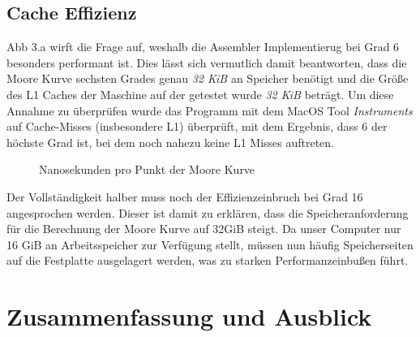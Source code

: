 \documentclass[course=erap]{aspdoc}
\begin{document}
\subsection{Cache Effizienz}
Abb 3.a wirft die Frage auf, weshalb die Assembler Implementierug bei Grad 6 besonders performant ist. Dies lässt sich vermutlich damit beantworten, dass die Moore Kurve sechsten Grades genau \textit{32 KiB} an Speicher benötigt und die Größe des L1 Caches der Maschine auf der getestet wurde \textit{32 KiB} beträgt. Um diese Annahme zu überprüfen wurde das Programm mit dem MacOS Tool \textit{Instruments} auf Cache-Misses (insbesondere L1) überprüft, mit dem Ergebnis, dass 6 der höchste Grad ist, bei dem noch nahezu keine L1 Misses auftreten.

\begin{figure}[htbp] 
    \centering
    \qquad
    \caption{Nanosekunden pro Punkt der Moore Kurve}%
    \label{fig:Laufzeitvergleich Skaliert}%
 \end{figure}
 
 Der Vollständigkeit halber muss noch der Effizienzeinbruch bei Grad 16 angesprochen werden. Dieser ist damit zu erklären, dass die Speicheranforderung für die Berechnung der Moore Kurve auf 32GiB steigt. Da unser Computer nur 16 GiB an Arbeitsspeicher zur Verfügung stellt, müssen nun häufig Speicherseiten auf die Festplatte ausgelagert werden, was zu starken Performanzeinbußen führt.



\section{Zusammenfassung und Ausblick}
\end{document}
